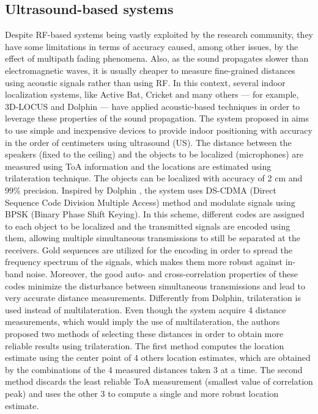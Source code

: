 \subsection{Ultrasound-based systems}
    Despite RF-based systems being vastly exploited by the research community, they have some limitations in terms of accuracy caused, among other issues, by the effect of multipath fading phenomena. Also, as the sound propagates slower than electromagnetic waves, it is usually cheaper to measure fine-grained distances using acoustic signals rather than using RF. In this context, several indoor localization systems, like Active Bat, Cricket and many others — for example, 3D-LOCUS and Dolphin — have applied acoustic-based techniques in order to leverage these properties of the sound propagation.
    The system proposed in \cite{us-cdma} aims to use simple and inexpensive devices to provide indoor positioning with accuracy in the order of centimeters using ultrasound (US). The distance between the speakers (fixed to the ceiling) and the objects to be localized (microphones) are measured using ToA information and the locations are estimated using trilateration technique. The objects can be localized with accuracy of 2 cm and 99\% precision.
    Inspired by Dolphin \cite{dolphin}, the system uses DS-CDMA (Direct Sequence Code Division Multiple Access) method and modulate signals using BPSK (Binary Phase Shift Keying). In this scheme, different codes are assigned to each object to be localized and the transmitted signals are encoded using them, allowing multiple simultaneous transmissions to still be separated at the receivers. Gold sequences are utilized for the encoding in order to spread the frequency spectrum of the signals, which makes them more robust against in-band noise. Moreover, the good auto- and cross-correlation properties of these codes minimize the disturbance between simultaneous transmissions and lead to very accurate distance measurements.
    Differently from Dolphin, trilateration is used instead of multilateration. Even though the system acquire 4 distance measurements, which would imply the use of multilateration, the authors proposed two methods of selecting these distances in order to obtain more reliable results using trilateration. The first method computes the location estimate using the center point of 4 others location estimates, which are obtained by the combinations of the 4 measured distances taken 3 at a time. The second method discards the least reliable ToA measurement (smallest value of correlation peak) and uses the other 3 to compute a single and more robust location estimate.
    
